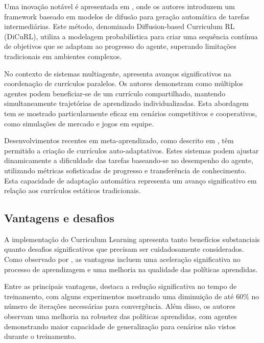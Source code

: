 Uma inovação notável é apresentada em \cite{https://openreview.net/forum?id=yRhrVaDOWE}, onde os autores introduzem um framework baseado em modelos de difusão para geração automática de tarefas intermediárias. Este método, denominado Diffusion-based Curriculum RL (DiCuRL), utiliza a modelagem probabilística para criar uma sequência contínua de objetivos que se adaptam ao progresso do agente, superando limitações tradicionais em ambientes complexos.

No contexto de sistemas multiagente, \cite{https://www.ijcai.org/proceedings/2017/757} apresenta avanços significativos na coordenação de currículos paralelos. Os autores demonstram como múltiplos agentes podem beneficiar-se de um currículo compartilhado, mantendo simultaneamente trajetórias de aprendizado individualizadas. Esta abordagem tem se mostrado particularmente eficaz em cenários competitivos e cooperativos, como simulações de mercado e jogos em equipe.

Desenvolvimentos recentes em meta-aprendizado, como descrito em \cite{https://arxiv.org/abs/2310.19424}, têm permitido a criação de currículos auto-adaptativos. Estes sistemas podem ajustar dinamicamente a dificuldade das tarefas baseando-se no desempenho do agente, utilizando métricas sofisticadas de progresso e transferência de conhecimento. Esta capacidade de adaptação automática representa um avanço significativo em relação aos currículos estáticos tradicionais.

\subsection{Vantagens e desafios}
\label{subsec:curriculum_vantagens_desafios}

A implementação do Curriculum Learning apresenta tanto benefícios substanciais quanto desafios significativos que precisam ser cuidadosamente considerados. Como observado por \cite{https://zilliz.com/ai-faq/what-is-curriculum-learning-in-reinforcement-learning}, as vantagens incluem uma aceleração significativa no processo de aprendizagem e uma melhoria na qualidade das políticas aprendidas.

Entre as principais vantagens, \cite{https://repositories.lib.utexas.edu/items/d6530e2e-35e5-452e-972c-8b3bb1dea93b} destaca a redução significativa no tempo de treinamento, com alguns experimentos mostrando uma diminuição de até 60\% no número de iterações necessárias para convergência. Além disso, os autores observam uma melhoria na robustez das políticas aprendidas, com agentes demonstrando maior capacidade de generalização para cenários não vistos durante o treinamento.

